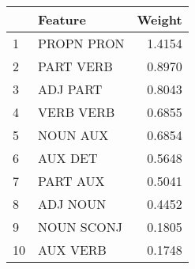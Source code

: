 \begin{tabular}{llr}
\toprule
{} &     Feature &  Weight \\
\midrule
1  &  PROPN PRON &  1.4154 \\
2  &   PART VERB &  0.8970 \\
3  &    ADJ PART &  0.8043 \\
4  &   VERB VERB &  0.6855 \\
5  &    NOUN AUX &  0.6854 \\
6  &     AUX DET &  0.5648 \\
7  &    PART AUX &  0.5041 \\
8  &    ADJ NOUN &  0.4452 \\
9  &  NOUN SCONJ &  0.1805 \\
10 &    AUX VERB &  0.1748 \\
\bottomrule
\end{tabular}
